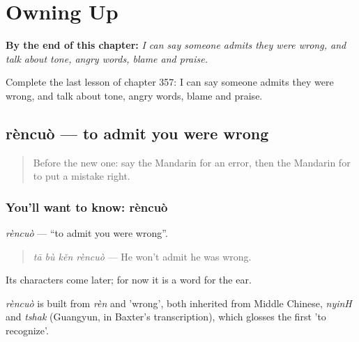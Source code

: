 
\chapter{Owning Up}
\label{ch:zh-owning-up}

\begin{chapteropening}
\textbf{By the end of this chapter:} \emph{I can say someone admits they were wrong, and talk about tone, angry words, blame and praise.}

Complete the last lesson of chapter 357: I can say someone admits they were wrong, and talk about tone, angry words, blame and praise.
\end{chapteropening}

\section[rèncuò]{rèncuò — to admit you were wrong}

\label{lesson:ZH-C357-rencuo}



\begin{quote}
Before the new one: say the Mandarin for an error, then the Mandarin for to put a mistake right.
\end{quote}

\subsection*{You'll want to know: rèncuò}
\emph{rèncuò} — \textquotedblleft{}to admit you were wrong\textquotedblright{}.

\begin{quote}
\emph{tā bù kěn rèncuò} — He won't admit he was wrong.
\end{quote}

Its characters come later; for now it is a word for the ear.

\begin{cousinweb}
\emph{rèncuò} is built from \emph{rèn} and  'wrong', both inherited from Middle Chinese, \emph{nyinH} and \emph{tshak} (Guangyun, in Baxter's transcription), which glosses the first 'to recognize'.
\end{cousinweb}

